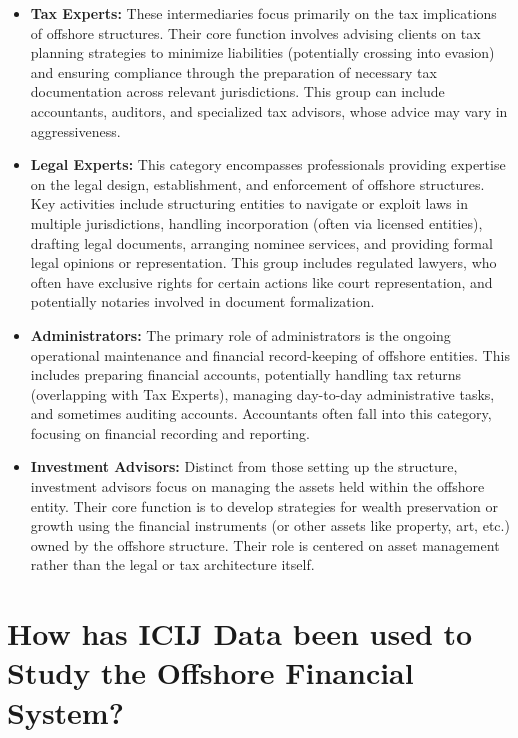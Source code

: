 \begin{itemize}[leftmargin=*]
    \item \textbf{Tax Experts:} These intermediaries focus primarily on the tax implications of offshore structures. Their core function involves advising clients on tax planning strategies to minimize liabilities (potentially crossing into evasion) and ensuring compliance through the preparation of necessary tax documentation across relevant jurisdictions. This group can include accountants, auditors, and specialized tax advisors, whose advice may vary in aggressiveness.
    
    \item \textbf{Legal Experts:} This category encompasses professionals providing expertise on the legal design, establishment, and enforcement of offshore structures. Key activities include structuring entities to navigate or exploit laws in multiple jurisdictions, handling incorporation (often via licensed entities), drafting legal documents, arranging nominee services, and providing formal legal opinions or representation. This group includes regulated lawyers, who often have exclusive rights for certain actions like court representation, and potentially notaries involved in document formalization.
    
    \item \textbf{Administrators:} The primary role of administrators is the ongoing operational maintenance and financial record-keeping of offshore entities. This includes preparing financial accounts, potentially handling tax returns (overlapping with Tax Experts), managing day-to-day administrative tasks, and sometimes auditing accounts. Accountants often fall into this category, focusing on financial recording and reporting.
    
    \item \textbf{Investment Advisors:} Distinct from those setting up the structure, investment advisors focus on managing the assets held within the offshore entity. Their core function is to develop strategies for wealth preservation or growth using the financial instruments (or other assets like property, art, etc.) owned by the offshore structure. Their role is centered on asset management rather than the legal or tax architecture itself.

\end{itemize}

\section{How has ICIJ Data been used to Study the Offshore Financial System?}

